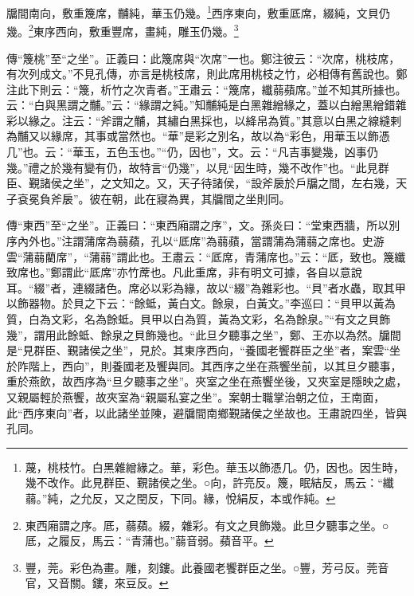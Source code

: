 牖間南向，敷重篾席，黼純，華玉仍幾。\footnote{蔑，桃枝竹。白黑雜繒緣之。華，彩色。華玉以飾憑几。仍，因也。因生時，幾不改作。此見群臣、覲諸侯之坐。○向，許亮反。篾，眠結反，馬云：“纖蒻。”純，之允反，又之閏反，下同。緣，悅絹反，本或作純。}西序東向，敷重厎席，綴純，文貝仍幾。\footnote{東西廂謂之序。厎，蒻蘋。綴，雜彩。有文之貝飾幾。此旦夕聽事之坐。○厎，之履反，馬云：“青蒲也。”蒻音弱。蘋音平。}東序西向，敷重豐席，畫純，雕玉仍幾。\footnote{豐，莞。彩色為畫。雕，刻鏤。此養國老饗群臣之坐。○豐，芳弓反。莞音官，又音關。鏤，來豆反。}


{\noindent\zhuan{}\fzbyks 傳“篾桃”至“之坐”。正義曰：此篾席與“次席”一也。鄭注彼云：“次席，桃枝席，有次列成文。”不見孔傳，亦言是桃枝席，則此席用桃枝之竹，必相傳有舊說也。鄭注此下則云：“篾，析竹之次青者。”王肅云：“篾席，纖蒻蘋席。”並不知其所據也。云：“白與黑謂之黼。”云：“緣謂之純。”知黼純是白黑雜繒緣之，蓋以白繒黑繒錯雜彩以緣之。注云：“斧謂之黼，其繡白黑採也，以絳帛為質。”其意以白黑之線縫剌為黼又以緣席，其事或當然也。“華”是彩之別名，故以為“彩色，用華玉以飾憑几”也。云：“華玉，五色玉也。”“仍，因也”，文。云：“凡吉事變幾，凶事仍幾。”禮之於幾有變有仍，故特言“仍幾”，以見“因生時，幾不改作”也。“此見群臣、覲諸侯之坐”，之文知之。又，天子待諸侯，“設斧扆於戶牖之間，左右幾，天子袞冕負斧扆”。彼在朝，此在寢為異，其牖間之坐則同。 \par}

{\noindent\zhuan{}\fzbyks 傳“東西”至“之坐”。正義曰：“東西廂謂之序”，文。孫炎曰：“堂東西牆，所以別序內外也。”注謂蒲席為蒻蘋，孔以“厎席”為蒻蘋，當謂蒲為蒲蒻之席也。史游雲“蒲蒻藺席”，“蒲蒻”謂此也。王肅云：“厎席，青蒲席也。”云：“厎，致也。篾纖致席也。”鄭謂此“厎席”亦竹蓆也。凡此重席，非有明文可據，各自以意說耳。“綴”者，連綴諸色。席必以彩為緣，故以“綴”為雜彩也。“貝”者水蟲，取其甲以飾器物。於貝之下云：“餘蚳，黃白文。餘泉，白黃文。”李巡曰：“貝甲以黃為質，白為文彩，名為餘蚳。貝甲以白為質，黃為文彩，名為餘泉。”“有文之貝飾幾”，謂用此餘蚳、餘泉之貝飾幾也。“此旦夕聽事之坐”，鄭、王亦以為然。牖間是“見群臣、覲諸侯之坐”，見於。其東序西向，“養國老饗群臣之坐”者，案雲“坐於阼階上，西向”，則養國老及饗與同。其西序之坐在燕饗坐前，以其旦夕聽事，重於燕飲，故西序為“旦夕聽事之坐”。夾室之坐在燕饗坐後，又夾室是隱映之處，又親屬輕於燕饗，故夾室為“親屬私宴之坐”。案朝士職掌治朝之位，王南面，此“西序東向”者，以此諸坐並陳，避牖間南鄉覲諸侯之坐故也。王肅說四坐，皆與孔同。 \par}

